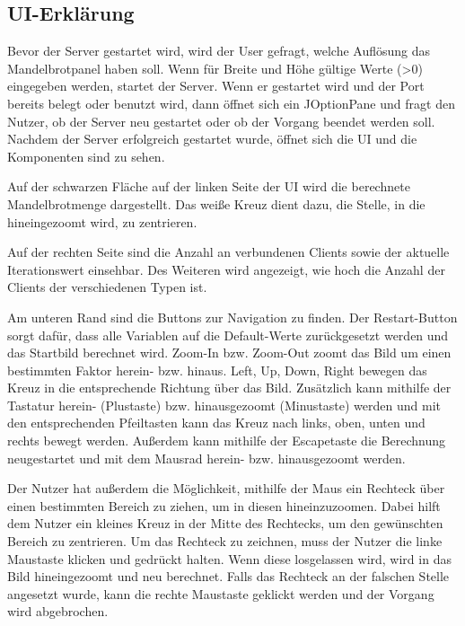\documentclass[12pt, onecolumn, notitlepage]{scrartcl}
\begin{document}
\subsection{UI-Erklärung}
Bevor der Server gestartet wird, wird der User gefragt, welche Auflösung das Mandelbrotpanel haben soll. Wenn für Breite und Höhe gültige Werte (>0) eingegeben werden, startet der Server. Wenn er gestartet wird und der Port bereits belegt oder benutzt wird, dann öffnet sich ein JOptionPane und fragt den Nutzer, ob der Server neu gestartet oder ob der Vorgang beendet werden soll. Nachdem der Server erfolgreich gestartet wurde, öffnet sich die UI und die Komponenten sind zu sehen. \par
Auf der schwarzen Fläche auf der linken Seite der UI wird die berechnete Mandelbrotmenge dargestellt. Das weiße Kreuz dient dazu, die Stelle, in die hineingezoomt wird, zu zentrieren. \par
Auf der rechten Seite sind die Anzahl an verbundenen Clients sowie der aktuelle Iterationswert einsehbar. Des Weiteren wird angezeigt, wie hoch die Anzahl der Clients der verschiedenen Typen ist. \par
Am unteren Rand sind die Buttons zur Navigation zu finden. Der Restart-Button sorgt dafür, dass alle Variablen auf die Default-Werte zurückgesetzt werden und das Startbild berechnet wird. Zoom-In bzw. Zoom-Out zoomt das Bild um einen bestimmten Faktor herein- bzw. hinaus. Left, Up, Down, Right bewegen das Kreuz in die entsprechende Richtung über das Bild. Zusätzlich kann mithilfe der Tastatur herein- (Plustaste) bzw. hinausgezoomt (Minustaste) werden und mit den entsprechenden Pfeiltasten kann das Kreuz nach links, oben, unten und rechts bewegt werden. Außerdem kann mithilfe der Escapetaste die Berechnung neugestartet und mit dem Mausrad herein- bzw. hinausgezoomt werden. \par
Der Nutzer hat außerdem die Möglichkeit, mithilfe der Maus ein Rechteck über einen bestimmten Bereich zu ziehen, um in diesen hineinzuzoomen. Dabei hilft dem Nutzer ein kleines Kreuz in der Mitte des Rechtecks, um den gewünschten Bereich zu zentrieren. Um das Rechteck zu zeichnen, muss der Nutzer die linke Maustaste klicken und gedrückt halten. Wenn diese losgelassen wird, wird in das Bild hineingezoomt und neu berechnet. Falls das Rechteck an der falschen Stelle angesetzt wurde, kann die rechte Maustaste geklickt werden und der Vorgang wird abgebrochen.
\end{document}

